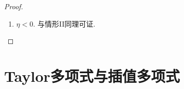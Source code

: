 \begin{4b}
\begin{enumerate}
\begin{proof}
\begin{enumerate}[label=(\Roman*)]
\begin{itemize}
而由于函数\(f'-\frac{\eta}{g}\)具有介值性, 因此存在\(\xi\in(a,b)\)使得\(f'(\xi)-\frac{\eta}{g(\xi)}=0\), 即\(f'(\xi)g(\xi)=\eta\).
\item \(g\)在\([a,b]\)上不恒正. 则\(g\)在\([a,b]\)上有最大零点\(s\in[a,b)\). 
由微分Darboux定理, 有\((s,b)\)中趋于\(s\)的点列\(\{x_n\}\), 
使得\(\lim_{n\rightarrow+\infty}f'(x_n)=f'(s)\). 
从而\(\lim_{n\rightarrow+\infty}f'(x_n)g(x_n)=0\). 
于是有\(k\geqslant 1\)使得\(f'(x_k)g(x_k)<\eta\). 
由于\(g\)在\([x_k,b]\)上恒正, 由(i)可得结论.
\end{itemize}
\item  \(\eta<0\). 与情形II同理可证.\qedhere
\end{enumerate}
\end{proof}
\end{enumerate}
\end{4b}

\section{Taylor多项式与插值多项式}
